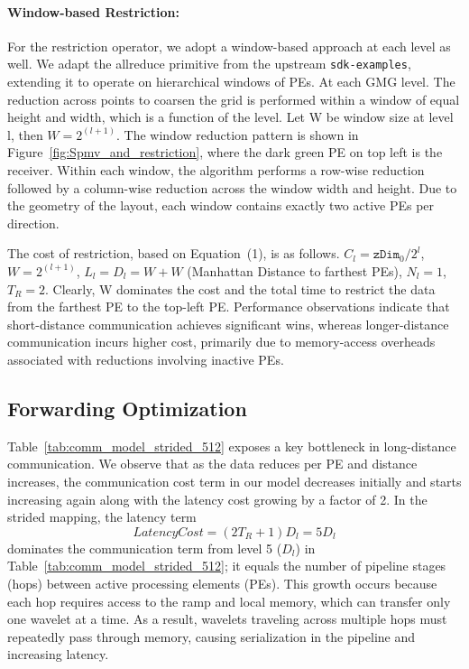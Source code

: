 \documentclass[sigconf]{acmart}
\begin{document}
\paragraph{Window-based Restriction:}
For the restriction operator, we adopt a window-based approach at each level as well.  We adapt the 
allreduce primitive from the upstream \texttt{sdk-examples}, extending it to operate on hierarchical windows of PEs. At each GMG level. The reduction across points to coarsen the grid is performed within a window of equal height and width, which is a function of the level. Let W be window size at level l, then $W = 2^{(l+1)}$. The window reduction pattern is shown in Figure~\ref{fig:Spmv_and_restriction}, where the dark green PE on top left is the receiver. Within each window, the algorithm performs a row-wise reduction followed by a column-wise reduction across the window width and height. Due to the geometry of the layout, each window contains exactly two active PEs per direction.
    
The cost of restriction, based on Equation~(1), is as follows.
$C_l = \texttt{zDim}_0/2^l$, $W = 2^{(l+1)}$, $L_l = D_l = W + W$
    (Manhattan Distance to farthest PEs), $N_l = 1$, $T_R = 2$.
Clearly, W dominates the cost and the total time to restrict the data from the farthest PE to the top-left PE. Performance observations indicate that short-distance communication achieves significant wins, whereas longer-distance communication incurs higher cost, primarily due to memory-access overheads associated with reductions involving inactive PEs. %

\subsection{Forwarding Optimization} \label{sec:forwarding}
Table~\ref{tab:comm_model_strided_512} exposes a key bottleneck in long-distance communication.  We observe that as the data reduces per PE and distance increases, the communication cost term in our model decreases initially and starts increasing again along with the latency cost growing by a factor of 2. 
In the strided mapping, the latency term
\begin{equation}\label{equation:latency}
   LatencyCost = (2T_R + 1)D_l = 5D_l    
\end{equation}
dominates the communication term from level 5 ($D_l$) in Table~\ref{tab:comm_model_strided_512}; it equals the number of pipeline stages (hops) between active processing elements (PEs). This growth occurs because each hop requires access to the ramp and local memory, which can transfer only one wavelet at a time. As a result, wavelets traveling across multiple hops must repeatedly pass through memory, causing serialization in the pipeline and increasing latency.
\end{document}
